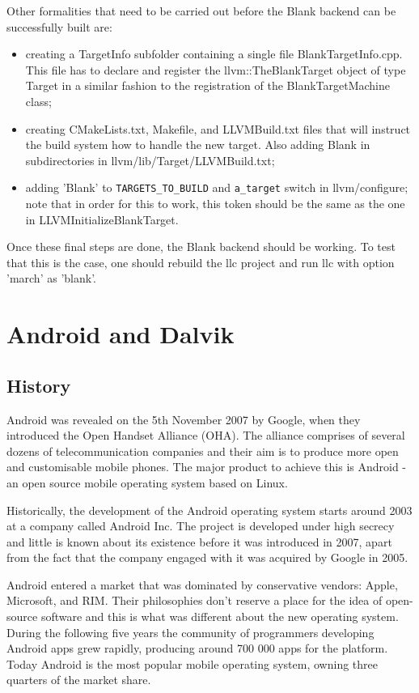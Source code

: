 \documentclass[parskip]{cs4rep}
\begin{document}
Other formalities that need to be carried out before the Blank backend can be successfully built are:
\begin{itemize}
\item
creating a TargetInfo subfolder containing a single file BlankTargetInfo.cpp. This file has to declare and register the llvm::TheBlankTarget object of type Target in a similar fashion to the registration of the BlankTargetMachine class;
\item
creating CMakeLists.txt, Makefile, and LLVMBuild.txt files that will instruct the build system how to handle the new target. Also adding Blank in subdirectories in llvm/lib/Target/LLVMBuild.txt;
\item
adding 'Blank' to \verb|TARGETS_TO_BUILD| and \verb|a_target| switch in llvm/configure; note that in order for this to work, this token should be the same as the one in LLVMInitializeBlankTarget.
\end{itemize}

Once these final steps are done, the Blank backend should be working. To test that this is the case, one should rebuild the llc project and run llc with option 'march' as 'blank'.

\section{Android and Dalvik}

\subsection{History}

Android was revealed on the 5th November 2007 by Google, when they introduced the Open Handset Alliance (OHA)\cite{DeLacey2007}. The alliance comprises of several dozens of telecommunication companies and their aim is to produce more open and customisable mobile phones. The major product to achieve this is Android - an open source mobile operating system based on Linux.

Historically, the development of the Android operating system starts around 2003 at a company called Android Inc.\cite{BloombergBusinessweek2005} The project is developed under high secrecy and little is known about its existence before it was introduced in 2007, apart from the fact that the company engaged with it was acquired by Google in 2005.

Android entered a market that was dominated by conservative vendors: Apple, Microsoft, and RIM. Their philosophies don't reserve a place for the idea of open-source software and this is what was different about the new operating system. During the following five years the community of programmers developing Android apps grew rapidly, producing around 700 000 apps for the platform\cite{Islam2012}. Today Android is the most popular mobile operating system, owning three quarters of the market share\cite{IDC2012}.
\end{document}
